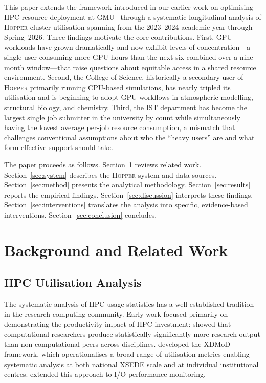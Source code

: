 \documentclass[11pt,letterpaper]{article}
\newcommand{\hopper}{\textsc{Hopper}}
\newcommand{\gmu}{GMU}
\begin{document}
This paper extends the framework introduced in our earlier work on optimising HPC
resource deployment at \gmu~\citep{orc2022internal} through a systematic
longitudinal analysis of \hopper{} cluster utilisation spanning from the
2023--2024 academic year through Spring~2026.  Three findings motivate the core
contributions.  First, GPU workloads have grown dramatically and now exhibit
levels of concentration---a single user consuming more GPU-hours than the next
six combined over a nine-month window---that raise questions about equitable
access in a shared resource environment.  Second, the College of Science,
historically a secondary user of \hopper{} primarily running CPU-based
simulations, has nearly tripled its utilisation and is beginning to adopt GPU
workflows in atmospheric modelling, structural biology, and chemistry.  Third,
the IST department has become the largest single job submitter in the university
by count while simultaneously having the lowest average per-job resource
consumption, a mismatch that challenges conventional assumptions about who the
``heavy users'' are and what form effective support should take.

The paper proceeds as follows.  Section~\ref{sec:related} reviews related work.
Section~\ref{sec:system} describes the \hopper{} system and data sources.
Section~\ref{sec:method} presents the analytical methodology.
Section~\ref{sec:results} reports the empirical findings.
Section~\ref{sec:discussion} interprets these findings.
Section~\ref{sec:interventions} translates the analysis into specific,
evidence-based interventions.  Section~\ref{sec:conclusion} concludes.

\section{Background and Related Work}
\label{sec:related}

\subsection{HPC Utilisation Analysis}

The systematic analysis of HPC usage statistics has a well-established tradition
in the research computing community.  Early work focused primarily on demonstrating
the productivity impact of HPC investment: \citet{smith2022} showed that
computational researchers produce statistically significantly more research output
than non-computational peers across disciplines.  \citet{furlani2013} developed
the XDMoD framework, which operationalises a broad range of utilisation metrics
enabling systematic analysis at both national XSEDE scale and at individual
institutional centres.  \citet{hammond2011} extended this approach to I/O
performance monitoring.
\end{document}
